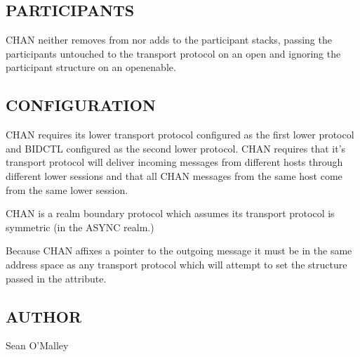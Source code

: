 \subsection*{PARTICIPANTS}

CHAN neither removes from nor adds to the participant stacks, passing
the participants untouched to the transport protocol on an open and
ignoring the participant structure on an openenable.

\subsection*{CONFIGURATION}

CHAN requires its lower transport protocol configured as the first
lower protocol and BIDCTL configured as the second lower protocol.
CHAN requires that it's transport protocol will deliver incoming messages
from different hosts through different lower sessions and that all
CHAN messages from the same host come from the same lower session.

CHAN is a realm boundary protocol which assumes its transport protocol is
symmetric (in the ASYNC realm.)

Because CHAN affixes a pointer to the outgoing message 
it must be in the same address space as any transport 
protocol which will attempt to set the structure passed 
in the attribute.

\subsection*{AUTHOR}

\noindent Sean O'Malley 

